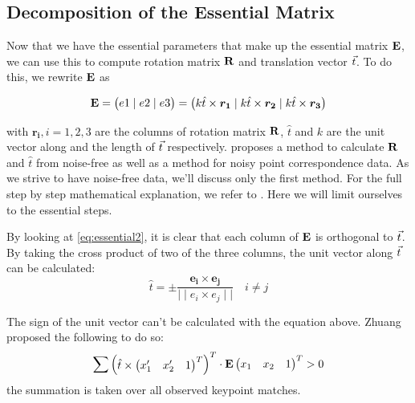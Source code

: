 \subsection{Decomposition of the Essential Matrix}
Now that we have the essential parameters that make up the essential matrix $\mathbf{E}$, we can use this to compute rotation matrix $\mathbf{R}$ and translation vector $\vec t$. To do this, we rewrite $\mathbf{E}$ as 

\begin{equation} \label{eq:essential2}
    \mathbf{E} = 
    \begin{pmatrix}
        e1 \mid e2 \mid e3
    \end{pmatrix} = 
    \begin{pmatrix}
        k \hat{t} \times \boldsymbol{r_1} \mid
        k \hat{t} \times \boldsymbol{r_2} \mid
        k \hat{t} \times \boldsymbol{r_3} 
    \end{pmatrix}
\end{equation}

with $\boldsymbol{r_i}, i = 1, 2, 3$ are the columns of rotation matrix $\mathbf{R}$, $\hat{t}$ and $k$ are the unit vector along and the length of $\vec t$ respectively. \cite{tekalp} proposes a method to calculate $\mathbf{R}$ and  $\hat{t}$ from noise-free as well as a method for noisy point correspondence data. As we strive to have noise-free data, we'll discuss only the first method. For the full step by step mathematical explanation, we refer to \cite{tekalp}. Here we will limit ourselves to the essential steps.\bigskip

By looking at \autoref{eq:essential2}, it is clear that each column of $\mathbf{E}$ is orthogonal to $\vec t$. By taking the cross product of two of the three columns, the unit vector along $\vec t$ can be calculated:
\begin{equation}
    \hat{t} = \pm \frac{\boldsymbol{e_i \times e_j}}{\mid\mid e_i \times e_j\mid\mid}
    \quad i \neq j
\end{equation}

The sign of the unit vector can't be calculated with the equation above. Zhuang \cite{ZHUANG1989175} proposed the following to do so:
\begin{equation}
    \sum\begin{pmatrix}
        \hat{t} \times \begin{pmatrix}
            x_1' & x_2' & 1
        \end{pmatrix}^T
    \end{pmatrix}^T
    \cdot \mathbf{E}\begin{pmatrix}
        x_1 & x_2 & 1
    \end{pmatrix}^T
    > 0
\end{equation}
the summation is taken over all observed keypoint matches.\bigskip

